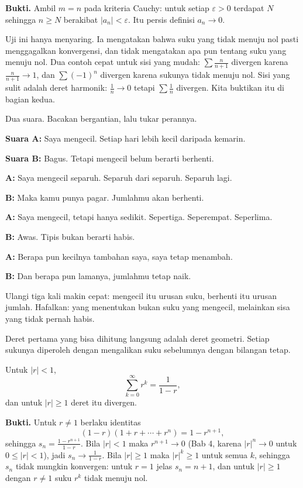 \noindent\textbf{Bukti.} Ambil $m=n$ pada kriteria Cauchy: untuk setiap $\varepsilon>0$ terdapat $N$ sehingga
$n \ge N$ berakibat $|a_n| < \varepsilon$. Itu persis definisi $a_n \to 0$.

Uji ini hanya menyaring. Ia mengatakan bahwa suku yang tidak menuju nol pasti
menggagalkan konvergensi, dan tidak mengatakan apa pun tentang suku yang menuju nol.
Dua contoh cepat untuk sisi yang mudah: $\sum \frac{n}{n+1}$ divergen karena
$\frac{n}{n+1} \to 1$, dan $\sum (-1)^n$ divergen karena sukunya tidak menuju nol.
Sisi yang sulit adalah deret harmonik: $\frac{1}{n} \to 0$ tetapi $\sum \frac{1}{n}$
divergen. Kita buktikan itu di bagian kedua.

\begin{bacakeras}
Dua suara. Bacakan bergantian, lalu tukar perannya.

\textbf{Suara A:} Saya mengecil. Setiap hari lebih kecil daripada kemarin.

\textbf{Suara B:} Bagus. Tetapi mengecil belum berarti berhenti.

\textbf{A:} Saya mengecil separuh. Separuh dari separuh. Separuh lagi.

\textbf{B:} Maka kamu punya pagar. Jumlahmu akan berhenti.

\textbf{A:} Saya mengecil, tetapi hanya sedikit. Sepertiga. Seperempat. Seperlima.

\textbf{B:} Awas. Tipis bukan berarti habis.

\textbf{A:} Berapa pun kecilnya tambahan saya, saya tetap menambah.

\textbf{B:} Dan berapa pun lamanya, jumlahmu tetap naik.

Ulangi tiga kali makin cepat: mengecil itu urusan suku, berhenti itu urusan jumlah.
Hafalkan: yang menentukan bukan suku yang mengecil, melainkan sisa yang tidak pernah
habis.
\end{bacakeras}

Deret pertama yang bisa dihitung langsung adalah deret geometri. Setiap sukunya
diperoleh dengan mengalikan suku sebelumnya dengan bilangan tetap.

\begin{teorema}
Untuk $|r| < 1$,
\[
  \sum_{k=0}^{\infty} r^k = \frac{1}{1-r},
\]
dan untuk $|r| \ge 1$ deret itu divergen.
\end{teorema}

\noindent\textbf{Bukti.} Untuk $r \neq 1$ berlaku identitas
\[
  (1-r)\left(1 + r + \cdots + r^n\right) = 1 - r^{n+1},
\]
sehingga $s_n = \frac{1-r^{n+1}}{1-r}$. Bila $|r|<1$ maka $r^{n+1} \to 0$ (Bab 4,
karena $|r|^{n} \to 0$ untuk $0 \le |r| < 1$), jadi $s_n \to \frac{1}{1-r}$. Bila
$|r| \ge 1$ maka $|r|^k \ge 1$ untuk semua $k$, sehingga $s_n$ tidak mungkin konvergen:
untuk $r=1$ jelas $s_n = n+1$, dan untuk $|r|\ge 1$ dengan $r\neq 1$ suku $r^k$ tidak
menuju nol.

